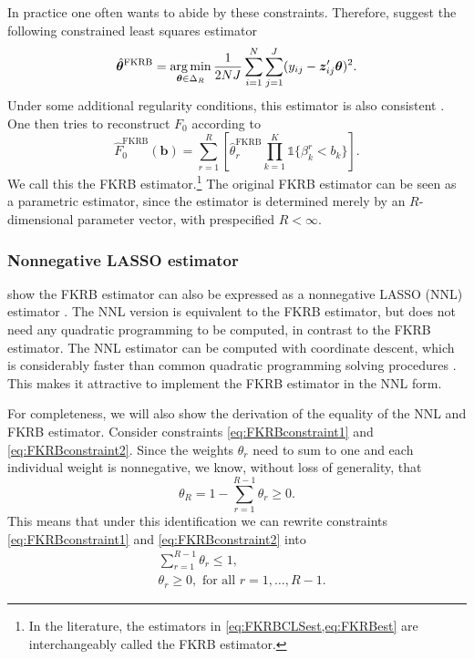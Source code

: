 In practice one often wants to abide by these constraints. 
Therefore, \citet{FoxKimRyanBajari2011} suggest the following constrained least squares estimator
\begin{equation}
\label{eq:FKRBCLSest}
    \hat{\bm{\theta}}^{\mathrm{FKRB}} = \operatorname*{arg\,min}_{\bm{\theta} \in \Delta_R}{\frac{1}{2NJ}\sum_{i=1}^{N}\sum_{j=1}^{J}(y_{ij}-\bm{z}^\prime_{ij}\bm{\theta})^2}.
\end{equation}
Under some additional regularity conditions, this estimator is also consistent \citep{Liew1976}.
One then tries to reconstruct $F_{0}$ according to
\begin{equation}
\label{eq:FKRBest}
    \hat{F}_{0}^{\mathrm{FKRB}}(\bm{b}) = \sum_{r=1}^R \left[\hat{\theta}^{\mathrm{FKRB}}_r \prod_{k=1}^{K}\mathds{1}{\{\beta^{r}_k < b_k\}}\right].
\end{equation}
We call this the FKRB estimator.\footnote{In the literature, the estimators in \cref{eq:FKRBCLSest,eq:FKRBest} are interchangeably called the FKRB estimator.}
The original FKRB estimator can be seen as a parametric estimator, since the estimator is determined merely by an $R$-dimensional parameter vector, with prespecified $R < \infty$.
\subsubsection{Nonnegative LASSO estimator}
\label{sec:FKRBNNL}
\citet{HeissHetzeneckerOsterhaus2022} show the FKRB estimator can also be expressed as a nonnegative LASSO (NNL) estimator \citep[see][]{WuYangLiu2014,EfronHastieJohnstoneTibshirani2004}.
The NNL version is equivalent to the FKRB estimator, but does not need any quadratic programming to be computed, in contrast to the FKRB estimator.
The NNL estimator can be computed with coordinate descent, which is considerably faster than common quadratic programming solving procedures \citep{FriedmanHastieTibshirani2010}.
This makes it attractive to implement the FKRB estimator in the NNL form.

For completeness, we will also show the derivation of the equality of the NNL and FKRB estimator.
Consider constraints \eqref{eq:FKRBconstraint1} and \eqref{eq:FKRBconstraint2}.
Since the weights $\theta_r$ need to sum to one and each individual weight is nonnegative, we know, without loss of generality, that 
\begin{equation}
\label{eq:FKRBNNLthetaR}
    \theta_R = 1 - \sum_{r=1}^{R-1}\theta_r \geq 0.
\end{equation}
This means that under this identification we can rewrite constraints \eqref{eq:FKRBconstraint1} and \eqref{eq:FKRBconstraint2} into
\begin{align}
\label{eq:FKRBNNLconstraint1}
    &\sum_{r=1}^{R-1}\theta_r \leq 1, \\
\label{eq:FKRBNNLconstraint2}
    &\theta_r \geq 0, \text{ for all } r = 1,\ldots,R-1.
\end{align}

